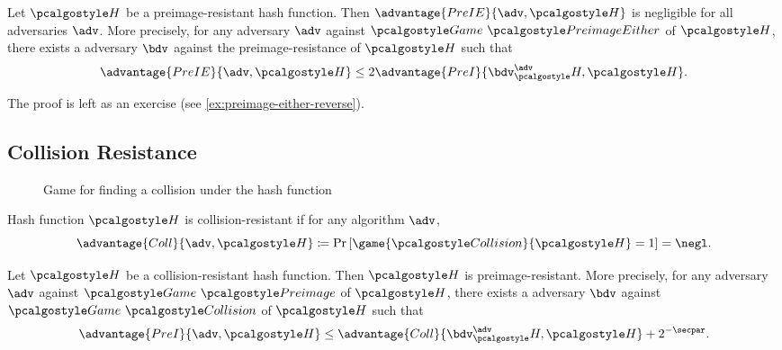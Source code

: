 \begin{proposition}\label{prop:preimage-either-reverse}
  Let $\algo{H}$ be a preimage-resistant hash function.
  Then $\advantage{PreIE}{\adv, \algo{H}}$ is negligible for all \ppt adversaries $\adv$.
  More precisely, for any \ppt adversary $\adv$ against $\Game~\algo{PreimageEither}$ of $\algo{H}$, there exists a \ppt adversary $\bdv$ against the preimage-resistance of $\algo{H}$ such that
    \[
    \advantage{PreIE}{\adv, \algo{H}} \leq 2\advantage{PreI}{\bdv^\adv_\algo{H}, \algo{H}}.
    \]
\end{proposition}

The proof is left as an exercise (see \autoref{ex:preimage-either-reverse}).


\subsection{Collision Resistance}

\begin{figure}[tbhp]
  \begin{center}
    \begin{tcolorbox}[width=8cm]
      \begin{pchstack}[center]
      \end{pchstack}
    \end{tcolorbox}
  \end{center}
  \caption{Game for finding a collision under the hash function \label{fig:break-hash-collision}}
\end{figure}

\begin{definition}
  Hash function $\algo{H}$ is collision-resistant if for any \ppt algorithm $\adv$,
 \[
  \advantage{Coll}{\adv, \algo{H}} \defeq \pr{\game{\algo{Collision}}{\algo{H}} = 1} = \negl.
 \]
\end{definition}

\begin{theorem}\label{thm:collision-implies-preimage}
  Let $\algo{H}$ be a collision-resistant hash function. Then $\algo{H}$ is preimage-resistant.
  More precisely, for any \ppt adversary $\adv$ against $\Game~\algo{Preimage}$ of $\algo{H}$, there exists a \ppt adversary $\bdv$ against $\Game~\algo{Collision}$ of $\algo{H}$ such that
    \[
    \advantage{PreI}{\adv, \algo{H}} \le \advantage{Coll}{\bdv^\adv_\algo{H}, \algo{H}} + 2^{-\secpar}.
    \]

\end{theorem}

